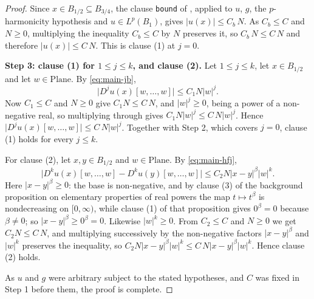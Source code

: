 \begin{proof}
Since $x\in B_{1/2}\subseteq B_{3/4}$, the clause \texttt{bound} of
, applied to $u$, $g$, the $p$-harmonicity hypothesis and
$u\in L^{p}(B_1)$, gives $\lvert u(x)\rvert\le C_b\,N$.  As $C_b\le C$ and $N\ge0$,
multiplying the inequality $C_b\le C$ by $N$ preserves it, so $C_b\,N\le C\,N$ and therefore
$\lvert u(x)\rvert\le C\,N$.  This is clause (1) at $j=0$.

\medskip\noindent\textbf{Step 3: clause (1) for $1\le j\le k$, and clause (2).}
Let $1\le j\le k$, let $x\in B_{1/2}$ and let $w\in\mathrm{Plane}$.  By \eqref{eq:main-jb},
\[
  \bigl\lvert D^{j}u(x)[w,\ldots,w]\bigr\rvert\le C_1N\lvert w\rvert^{j}.
\]
Now $C_1\le C$ and $N\ge0$ give $C_1N\le C\,N$, and $\lvert w\rvert^{j}\ge0$, being a power of a
non-negative real, so multiplying through gives $C_1N\lvert w\rvert^{j}\le C\,N\lvert
w\rvert^{j}$.  Hence $\lvert D^{j}u(x)[w,\ldots,w]\rvert\le C\,N\lvert w\rvert^{j}$.  Together
with Step 2, which covers $j=0$, clause (1) holds for every $j\le k$.

For clause (2), let $x,y\in B_{1/2}$ and $w\in\mathrm{Plane}$.  By \eqref{eq:main-hfj},
\[
  \bigl\lvert D^{k}u(x)[w,\ldots,w]-D^{k}u(y)[w,\ldots,w]\bigr\rvert
  \le C_2N\lvert x-y\rvert^{\beta}\lvert w\rvert^{k}.
\]
Here $\lvert x-y\rvert^{\beta}\ge0$: the base is non-negative, and by clause (3) of the
background proposition on elementary properties of real powers the map $t\mapsto t^{\beta}$ is
nondecreasing on $[0,\infty)$, while clause (1) of that proposition gives $0^{\beta}=0$ because
$\beta\ne0$; so $\lvert x-y\rvert^{\beta}\ge0^{\beta}=0$.  Likewise
$\lvert w\rvert^{k}\ge0$.  From $C_2\le C$ and $N\ge0$ we get $C_2N\le C\,N$, and multiplying
successively by the non-negative factors $\lvert x-y\rvert^{\beta}$ and $\lvert w\rvert^{k}$
preserves the inequality, so
$C_2N\lvert x-y\rvert^{\beta}\lvert w\rvert^{k}\le C\,N\lvert x-y\rvert^{\beta}\lvert
w\rvert^{k}$.  Hence clause (2) holds.

\medskip\noindent As $u$ and $g$ were arbitrary subject to the stated hypotheses, and $C$ was
fixed in Step 1 before them, the proof is complete.
\end{proof}
